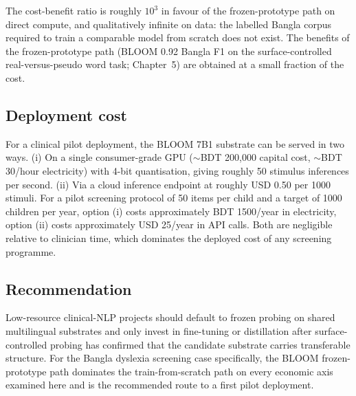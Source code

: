 The cost-benefit ratio is roughly $10^{3}$ in favour of the frozen-prototype path on direct compute, and qualitatively infinite on data: the labelled Bangla corpus required to train a comparable model from scratch does not exist. The benefits of the frozen-prototype path (BLOOM 0.92 Bangla F1 on the surface-controlled real-versus-pseudo word task; Chapter~5) are obtained at a small fraction of the cost.

\subsection*{Deployment cost}

For a clinical pilot deployment, the BLOOM 7B1 substrate can be served in two ways. (i) On a single consumer-grade GPU ($\sim$BDT 200{,}000 capital cost, $\sim$BDT 30/hour electricity) with 4-bit quantisation, giving roughly 50 stimulus inferences per second. (ii) Via a cloud inference endpoint at roughly USD 0.50 per 1000 stimuli. For a pilot screening protocol of 50 items per child and a target of 1000 children per year, option (i) costs approximately BDT 1500/year in electricity, option (ii) costs approximately USD 25/year in API calls. Both are negligible relative to clinician time, which dominates the deployed cost of any screening programme.

\subsection*{Recommendation}

Low-resource clinical-NLP projects should default to frozen probing on shared multilingual substrates and only invest in fine-tuning or distillation after surface-controlled probing has confirmed that the candidate substrate carries transferable structure. For the Bangla dyslexia screening case specifically, the BLOOM frozen-prototype path dominates the train-from-scratch path on every economic axis examined here and is the recommended route to a first pilot deployment.
